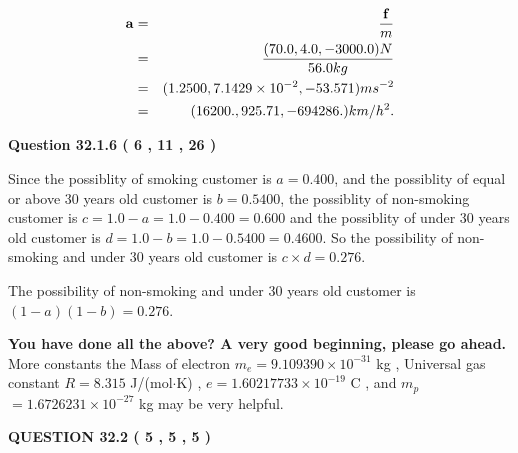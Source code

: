 \documentclass[12pt]{article}
\begin{document}
\begin{eqnarray*}
\mathbf{a}&=&\frac{\mathbf{f}}m  \\
&=&\frac{(
70.0 ,
4.0 ,
-3000.0 )N
}{ %
56.0 kg}  \\
&=&(
1.2500 ,
7.1429 \times 10^{-2},
-53.571
)ms^{-2} \\
&=&(
16200. ,
925.71 ,
-694286.
)km/h^2.
\end{eqnarray*}
 
 
 
  
\vspace{0.2in}
  
{\textbf{\Large{Question
32.1.6 
 (           6 ,          11 ,          26 )
}}}
  
  
 
 
\noindent{}

Since the possiblity of  %
smoking customer is $ a =  %
0.400 $,
and the possiblity of  %
equal or above 30 years old customer is $ b =  %
0.5400 $,
the possiblity of  %
non-smoking customer is $ c = 1.0 - a = 1.0 -
0.400
=  %
0.600 $ and the possiblity of  %
under 30 years old
customer is $ d = 1.0 - b = 1.0 -  %
0.5400 =  %
0.4600  $.
So the possibility of  %
 non-smoking and  %
under 30 years old
customer is $ c \times d =  %
0.276 $.
 
 
 
 
 
\noindent{}

The possibility of  %
 non-smoking and  %
under 30 years old
customer is $ (1-a)(1-b) =  %
0.276 $.
 
 
   
   
\vspace{0.3in}
{\textbf{\LARGE{You have done all the above? A very good beginning, please go ahead.}}}
More constants the
Mass of electron
$m_e$$ =
9.109390 \times 10^{-31} $
kg
,
Universal gas constant
$R$$ =
8.315 $
J/(mol$\cdot $K)
,
$e$$ =
1.60217733 \times 10^{-19} $
C
, and
$m_p$$ =
1.6726231 \times 10^{-27} $
kg
%
may be very helpful.
\vspace{0.3in}
   
   
  
\vspace{0.2in}
  
{\textbf{\Large{QUESTION
32.2 
 (           5 ,           5 ,           5 )
}}}
  
  
 
\end{document}
